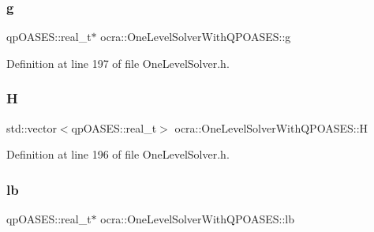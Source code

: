 \hypertarget{classocra_1_1OneLevelSolverWithQPOASES_a56fea8397d0c6b40fee373d8863f0b26}{}\label{classocra_1_1OneLevelSolverWithQPOASES_a56fea8397d0c6b40fee373d8863f0b26} 
\subsubsection{\texorpdfstring{g}{g}}
{\footnotesize\ttfamily qp\+O\+A\+S\+E\+S\+::real\+\_\+t$\ast$ ocra\+::\+One\+Level\+Solver\+With\+Q\+P\+O\+A\+S\+E\+S\+::g\hspace{0.3cm}{\ttfamily [protected]}}



Definition at line 197 of file One\+Level\+Solver.\+h.

\hypertarget{classocra_1_1OneLevelSolverWithQPOASES_aba3bdf7d777d9e3e8015570652cf396a}{}\label{classocra_1_1OneLevelSolverWithQPOASES_aba3bdf7d777d9e3e8015570652cf396a} 
\subsubsection{\texorpdfstring{H}{H}}
{\footnotesize\ttfamily std\+::vector$<$qp\+O\+A\+S\+E\+S\+::real\+\_\+t$>$ ocra\+::\+One\+Level\+Solver\+With\+Q\+P\+O\+A\+S\+E\+S\+::H\hspace{0.3cm}{\ttfamily [protected]}}



Definition at line 196 of file One\+Level\+Solver.\+h.

\hypertarget{classocra_1_1OneLevelSolverWithQPOASES_a82eaebae8f92464066e9b5348b1737f9}{}\label{classocra_1_1OneLevelSolverWithQPOASES_a82eaebae8f92464066e9b5348b1737f9} 
\subsubsection{\texorpdfstring{lb}{lb}}
{\footnotesize\ttfamily qp\+O\+A\+S\+E\+S\+::real\+\_\+t$\ast$ ocra\+::\+One\+Level\+Solver\+With\+Q\+P\+O\+A\+S\+E\+S\+::lb\hspace{0.3cm}{\ttfamily [protected]}}



